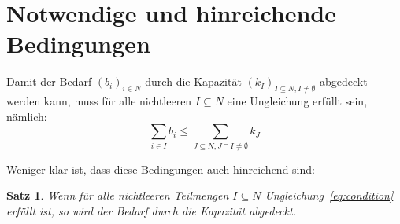 \documentclass{article}
\newtheorem{theorem}{Satz}
\begin{document}
	
	\section{Notwendige und hinreichende Bedingungen}
		
	Damit der Bedarf $(b_i)_{i\in N}$ durch die Kapazität $(k_I)_{I\subseteq N, I\neq \emptyset}$ abgedeckt werden kann, muss für alle nichtleeren $I\subseteq N$ eine Ungleichung erfüllt sein, nämlich:
	\begin{equation}
			\sum_{i \in I}b_i \leq \sum_{J\subseteq N, J\cap I \neq \emptyset}k_J
			\label{eq:condition}
	\end{equation}

	
	Weniger klar ist, dass diese Bedingungen auch hinreichend sind:

	\begin{theorem}
		Wenn für alle nichtleeren Teilmengen $I\subseteq N$ Ungleichung~\ref{eq:condition} erfüllt ist, so wird der Bedarf durch die Kapazität abgedeckt.
	\end{theorem}
	
\end{document}
